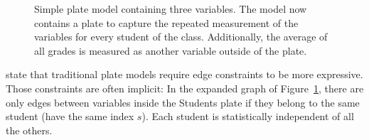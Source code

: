 \begin{figure}[t]
	\begin{center}
    	\scalebox{\tikzScale}{\adjustTikzSize }
	\end{center}
\caption[Simple plate model containing three variables.]{Simple plate model containing three variables. The model now contains a plate to capture the repeated measurement of the variables for every student of the class. Additionally, the average of all grades is measured as another variable outside of the plate.}
		\label{fig:simple_platemodel}
\end{figure}

\textcite{heckerman2007probabilistic} state that traditional plate models require edge constraints to be more expressive. Those constraints are often implicit: In the expanded graph of Figure~\ref{fig:simple_platemodel}, there are only edges between variables inside the Students plate if they belong to the same student (have the same index $s$). Each student is statistically independent of all the others.

